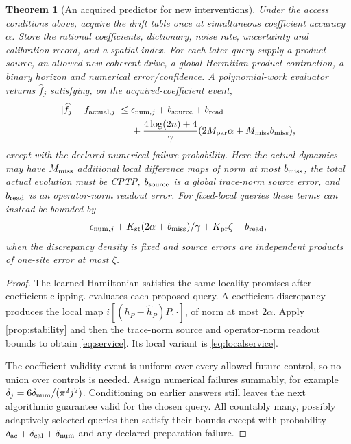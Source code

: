 \documentclass[11pt,reqno]{amsart}
\numberwithin{equation}{section}
\newtheorem{theorem}{Theorem}[section]
\theoremstyle{definition}
\theoremstyle{remark}
\newcommand{\abs}[1]{\lvert#1\rvert}
\begin{document}
\begin{theorem}[An acquired predictor for new interventions]\label{thm:service}
Under the access conditions above, acquire the drift table once at simultaneous coefficient accuracy $\alpha$. Store the rational coefficients, dictionary, noise rate, uncertainty and calibration record, and a spatial index. For each later query supply a product source, an allowed new coherent drive, a global Hermitian product contraction, a binary horizon and numerical error/confidence. A polynomial-work evaluator returns $\widehat f_j$ satisfying, on the acquired-coefficient event,
\begin{align}\label{eq:service}
 \abs{\widehat f_j-f_{{\rm actual},j}}
 \leq{}&\epsilon_{{\rm num},j}+b_{\rm source}+b_{\rm read}\notag\\
 &+\frac{4\log(2n)+4}{\gamma}
       (2M_{\rm par}\alpha+M_{\rm miss}b_{\rm miss}),
\end{align}
except with the declared numerical failure probability. Here the actual dynamics may have $M_{\rm miss}$ additional local difference maps of norm at most $b_{\rm miss}$, the total actual evolution must be CPTP, $b_{\rm source}$ is a global trace-norm source error, and $b_{\rm read}$ is an operator-norm readout error. For fixed-local queries these terms can instead be bounded by
\begin{equation}\label{eq:localservice}
 \epsilon_{{\rm num},j}+K_{\rm st}(2\alpha+b_{\rm miss})/\gamma
       +K_{\rm pr}\zeta+b_{\rm read},
\end{equation}
when the discrepancy density is fixed and source errors are independent products of one-site error at most $\zeta$.
\end{theorem}
\begin{proof}
The learned Hamiltonian satisfies the same locality promises after coefficient clipping.  evaluates each proposed query. A coefficient discrepancy produces the local map $i[(h_P-\widehat h_P)P,\cdot]$, of norm at most $2\alpha$. Apply \cref{prop:stability} and then the trace-norm source and operator-norm readout bounds to obtain \eqref{eq:service}. Its local variant is \eqref{eq:localservice}.

The coefficient-validity event is uniform over every allowed future control, so no union over controls is needed. Assign numerical failures summably, for example $\delta_j=6\delta_{\rm num}/(\pi^2j^2)$. Conditioning on earlier answers still leaves the next algorithmic guarantee valid for the chosen query. All countably many, possibly adaptively selected queries then satisfy their bounds except with probability $\delta_{\rm ac}+\delta_{\rm cal}+\delta_{\rm num}$ and any declared preparation failure.
\end{proof}
\end{document}
